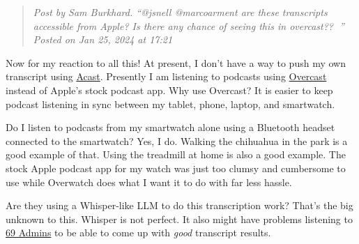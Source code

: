 \begin{quote}
\emph{Post by Sam Burkhard. ``@jsnell @marcoarment are these transcripts
accessible from Apple? Is there any chance of seeing this in overcast??
👀'' Posted on Jan 25, 2024 at 17:21}
\end{quote}

Now for my reaction to all this! At present, I don't have a way to push
my own transcript using \href{https://www.acast.com}{Acast}. Presently I
am listening to podcasts using \href{https://overcast.fm}{Overcast}
instead of Apple's stock podcast app. Why use Overcast? It is easier to
keep podcast listening in sync between my tablet, phone, laptop, and
smartwatch.

Do I listen to podcasts from my smartwatch alone using a Bluetooth
headset connected to the smartwatch? Yes, I do. Walking the chihuahua in
the park is a good example of that. Using the treadmill at home is also
a good example. The stock Apple podcast app for my watch was just too
clumsy and cumbersome to use while Overwatch does what I want it to do
with far less hassle.

Are they using a Whisper-like LLM to do this transcription work? That's
the big unknown to this. Whisper is not perfect. It also might have
problems listening to \href{https://69admins.com}{69 Admins} to be able
to come up with \emph{good} transcript results.
